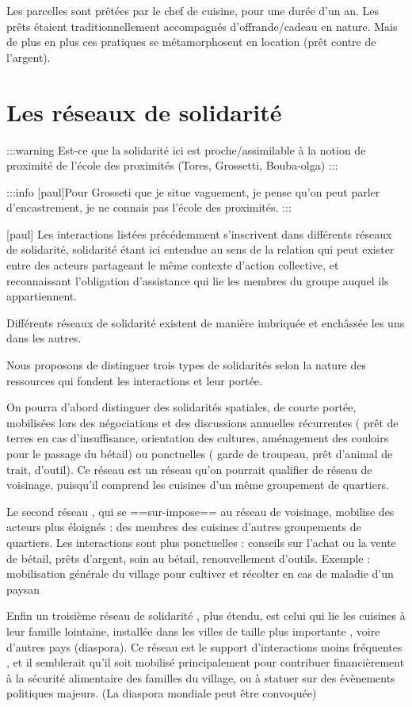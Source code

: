 Les parcelles sont prêtées par le chef de cuisine, pour une durée d'un an. Les prêts étaient traditionnellement accompagnés d'offrande/cadeau en nature. Mais de plus en plus ces pratiques se métamorphosent en location (prêt contre de l'argent).

\section{Les réseaux de solidarité}

:::warning
Est-ce que la solidarité ici est proche/assimilable à la notion de proximité de l'école des proximités (Tores, Grossetti, Bouba-olga)
:::

:::info
[paul]Pour Grosseti que je situe vaguement, je pense qu'on peut parler d'encastrement, je ne connais pas l'école des proximités.
:::

[paul] Les interactions listées précédemment s'inscrivent dans différents réseaux de solidarité, solidarité étant ici entendue au sens de la relation qui peut exister entre des acteurs partageant le même contexte d'action collective, et reconnaissant l'obligation d'assistance qui lie les membres du groupe auquel ils appartiennent.


Différents réseaux de solidarité existent de manière imbriquée et enchâssée les uns dans les autres. 

Nous proposons de distinguer trois types de solidarités selon la nature des ressources qui fondent les interactions et leur portée.

On pourra d'abord distinguer des solidarités spatiales, de courte portée,  mobilisées lors des négociations et des discussions annuelles récurrentes ( prêt de terres en cas d'insuffisance, orientation des cultures, aménagement des couloirs pour le passage du bétail) ou ponctuelles ( garde de troupeau, prêt d'animal de trait, d'outil). 
Ce réseau est un réseau qu'on pourrait qualifier de réseau de  voisinage, puisqu'il comprend les cuisines d'un même groupement de quartiers. 


Le second réseau , qui se ==sur-impose== au réseau de voisinage,  mobilise des acteurs plus éloignés : des  membres des cuisines d'autres groupements de quartiers. 
Les interactions sont plus ponctuelles : conseils sur l'achat ou la vente de bétail, prêts d'argent, soin au bétail, renouvellement d'outils. Exemple : mobilisation générale du village pour cultiver et récolter en cas de maladie d'un paysan 


Enfin un troisième réseau de solidarité , plus étendu, est celui qui lie les cuisines à leur famille lointaine, installée dans les villes  de taille plus importante , voire d'autres pays (diaspora).
Ce réseau est le support d'interactions  moins fréquentes , et il semblerait qu'il soit mobilisé principalement pour contribuer financièrement à la sécurité alimentaire des familles du village, ou à statuer sur des évènements politiques majeurs. (La diaspora mondiale peut être convoquée)

